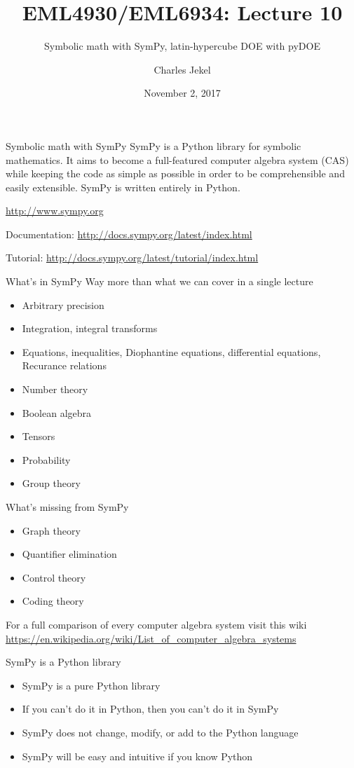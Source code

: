 \documentclass[10pt]{beamer}
\title{EML4930/EML6934: Lecture 10}
\subtitle{Symbolic math with SymPy, latin-hypercube DOE with pyDOE }
\date{November 2, 2017}
\author{Charles Jekel}
\begin{document}
\maketitle


\begin{frame}{Symbolic math with SymPy}
SymPy is a Python library for symbolic mathematics. It aims to become a full-featured computer algebra system (CAS) while keeping the code as simple as possible in order to be comprehensible and easily extensible. SymPy is written entirely in Python. 

\url{http://www.sympy.org}

Documentation: \url{http://docs.sympy.org/latest/index.html}

Tutorial: \url{http://docs.sympy.org/latest/tutorial/index.html}
\end{frame}

\begin{frame}{What's in SymPy}
Way more than what we can cover in a single lecture
\begin{itemize}
\item Arbitrary precision
\item Integration, integral transforms
\item Equations, inequalities, Diophantine equations, differential equations, Recurance relations
\item Number theory
\item Boolean algebra
\item Tensors 
\item Probability 
\item Group theory
\end{itemize}
\end{frame}

\begin{frame}{What's missing from SymPy}
\begin{itemize}
\item Graph theory 
\item Quantifier elimination
\item Control theory
\item Coding theory
\end{itemize}
For a full comparison of every computer algebra system visit this wiki \url{https://en.wikipedia.org/wiki/List_of_computer_algebra_systems}
\end{frame}

\begin{frame}{SymPy is a Python library}
\begin{itemize}
\item SymPy is a pure Python library 
\item If you can't do it in Python, then you can't do it in SymPy
\item SymPy does not change, modify, or add to the Python language
\item SymPy will be easy and intuitive if you know Python
\end{itemize}
\end{frame}
\end{document}
